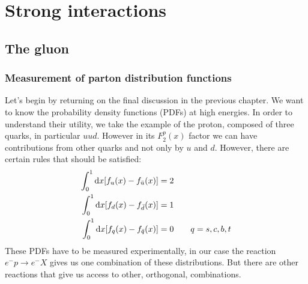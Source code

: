 \documentclass[../../main/main.tex]{subfiles}
\begin{document}
\chapter{Strong interactions}


\section{The gluon}

\subsection{Measurement of parton distribution functions}
Let's begin by returning on the final discussion in the previous chapter. We want to know the probability density functions (PDFs) at high energies. In order to understand their utility, we take the example of the proton, composed of three quarks, in particular \( uud \). However in its \( F_2^p(x) \) factor we can have contributions from other quarks and not only by \( u \) and \( d \). However, there are certain rules that should be satisfied:
\begin{align}
	\int_{0}^{1} \mathrm{d}{x} \qty[f_u(x) - f_{\bar{u}}(x)] &= 2	\\
	\int_{0}^{1} \mathrm{d}{x} \qty[f_d(x) - f_{\bar{d}}(x)] &= 1	\\
	\int_{0}^{1} \mathrm{d}{x} \qty[f_q(x) - f_{\bar{q}}(x)] &= 0	\qquad q = s, c, b, t
\end{align}
These PDFs have to be measured experimentally, in our case the reaction \( e^-p \longrightarrow e^-X \) gives us one combination of these distributions. But there are other reactions that give us access to other, orthogonal, combinations.
\end{document}

